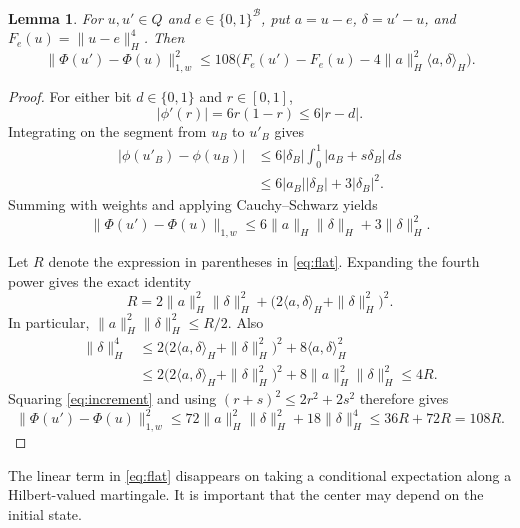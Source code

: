 \documentclass[11pt]{article}
\newtheorem{lemma}[theorem]{Lemma}
\theoremstyle{definition}
\theoremstyle{remark}
\numberwithin{equation}{section}
\begin{document}
\begin{lemma}\label{lem:flat}
For $u,u'\in Q$ and $e\in\{0,1\}^{\mathcal B}$, put
$a=u-e$, $\delta=u'-u$, and $F_e(u)=\|u-e\|_H^4$. Then
\begin{equation}\label{eq:flat}
 \|\Phi(u')-\Phi(u)\|_{1,w}^2
 \leq108\bigl(F_e(u')-F_e(u)
                   -4\|a\|_H^2\langle a,\delta\rangle_H\bigr).
\end{equation}
\end{lemma}

\begin{proof}
For either bit $d\in\{0,1\}$ and $r\in[0,1]$,
\[
 |\phi'(r)|=6r(1-r)\leq6|r-d|.
\]
Integrating on the segment from $u_B$ to $u'_B$ gives
\begin{align*}
 |\phi(u'_B)-\phi(u_B)|
 &\leq6|\delta_B|\int_0^1|a_B+s\delta_B|\,ds\\
 &\leq6|a_B||\delta_B|+3|\delta_B|^2.
\end{align*}
Summing with weights and applying Cauchy--Schwarz yields
\begin{equation}\label{eq:increment}
 \|\Phi(u')-\Phi(u)\|_{1,w}
 \leq6\|a\|_H\|\delta\|_H+3\|\delta\|_H^2.
\end{equation}

Let $R$ denote the expression in parentheses in \eqref{eq:flat}.
Expanding the fourth power gives the exact identity
\begin{equation}\label{eq:remainder}
 R=2\|a\|_H^2\|\delta\|_H^2
        +\bigl(2\langle a,\delta\rangle_H+\|\delta\|_H^2\bigr)^2.
\end{equation}
In particular, $\|a\|_H^2\|\delta\|_H^2\leq R/2$. Also
\begin{align*}
 \|\delta\|_H^4
 &\leq2\bigl(2\langle a,\delta\rangle_H+\|\delta\|_H^2\bigr)^2
              +8\langle a,\delta\rangle_H^2\\
 &\leq2\bigl(2\langle a,\delta\rangle_H+\|\delta\|_H^2\bigr)^2
              +8\|a\|_H^2\|\delta\|_H^2
 \leq4R.
\end{align*}
Squaring \eqref{eq:increment} and using $(r+s)^2\leq2r^2+2s^2$
therefore gives
\[
 \|\Phi(u')-\Phi(u)\|_{1,w}^2
 \leq72\|a\|_H^2\|\delta\|_H^2+18\|\delta\|_H^4
 \leq36R+72R=108R.
\]
\end{proof}

The linear term in \eqref{eq:flat} disappears on taking a
conditional expectation along a Hilbert-valued martingale. It is
important that the center may depend on the initial state.
\end{document}
